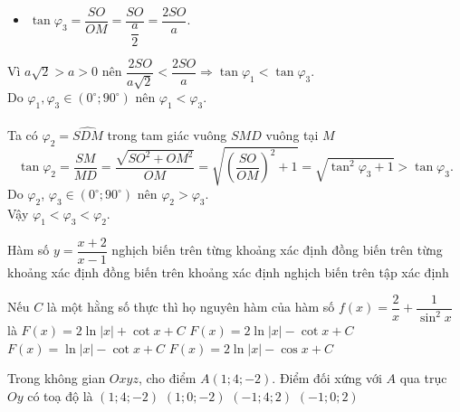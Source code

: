 \begin{ex}
{\begin{itemize}
			\item $\tan\varphi_3 = \dfrac{SO}{OM} = \dfrac{SO}{\dfrac{a}{2}} = \dfrac{2SO}{a}$.
		\end{itemize}
		Vì $a\sqrt{2} > a > 0$ nên $\dfrac{2SO}{a\sqrt{2}} < \dfrac{2SO}{a} \Rightarrow \tan\varphi_1 < \tan\varphi_3$.\\
		Do $\varphi_1, \varphi_3 \in \left(0^\circ; 90^\circ\right)$ nên $\varphi_1 < \varphi_3$.\\
		\\
		Ta có $\varphi_2 = \widehat{SDM}$ trong tam giác vuông $SMD$ vuông tại $M$
		\[\tan\varphi_2 = \dfrac{SM}{MD} = \dfrac{\sqrt{SO^2 + OM^2}}{OM} = \sqrt{\left(\dfrac{SO}{OM}\right)^2 + 1} = \sqrt{\tan^2\varphi_3 + 1} > \tan\varphi_3.\]
		Do $\varphi_2$, $\varphi_3 \in \left(0^\circ; 90^\circ\right)$ nên $\varphi_2 > \varphi_3$.\\
		Vậy $\varphi_1 < \varphi_3 < \varphi_2$.
	}
\end{ex}

\begin{ex}%
	Hàm số $y=\dfrac{x+2}{x-1}$
	\choice
	{\True nghịch biến trên từng khoảng xác định}
	{đồng biến trên từng khoảng xác định}
	{đồng biến trên khoảng xác định}
	{nghịch biến trên tập xác định}
\end{ex}

\begin{ex}%
	Nếu $C$ là một hằng số thực thì họ nguyên hàm của hàm số $f(x)=\dfrac{2}{x}+\dfrac{1}{\sin^2 x}$ là
	\choice
	{$F(x)=2\ln|x|+\cot x+C$}
	{\True $F(x)=2\ln|x|-\cot x+C$}
	{$F(x)=\ln|x|-\cot x+C$}
	{$F(x)=2\ln|x|-\cos x+C$}
\end{ex}

\begin{ex}%
	Trong không gian $Oxyz$, cho điểm $A(1;4;-2)$. Điểm đối xứng với $A$ qua trục $Oy$ có toạ độ là
	\choice
	{$(1;4;-2)$}
	{$(1;0;-2)$}
	{\True $(-1;4;2)$}
	{$(-1;0;2)$}
\end{ex}

